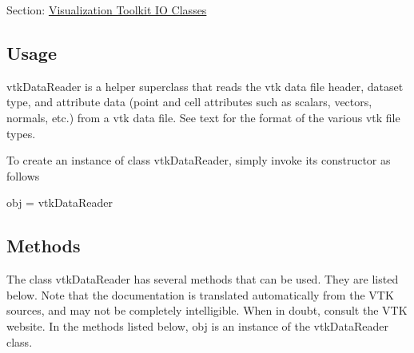 Section\-: \hyperlink{sec_vtkio}{Visualization Toolkit I\-O Classes} \hypertarget{vtkwidgets_vtkxyplotwidget_Usage}{}\subsection{Usage}\label{vtkwidgets_vtkxyplotwidget_Usage}
vtk\-Data\-Reader is a helper superclass that reads the vtk data file header, dataset type, and attribute data (point and cell attributes such as scalars, vectors, normals, etc.) from a vtk data file. See text for the format of the various vtk file types.

To create an instance of class vtk\-Data\-Reader, simply invoke its constructor as follows \begin{DoxyVerb}  obj = vtkDataReader
\end{DoxyVerb}
 \hypertarget{vtkwidgets_vtkxyplotwidget_Methods}{}\subsection{Methods}\label{vtkwidgets_vtkxyplotwidget_Methods}
The class vtk\-Data\-Reader has several methods that can be used. They are listed below. Note that the documentation is translated automatically from the V\-T\-K sources, and may not be completely intelligible. When in doubt, consult the V\-T\-K website. In the methods listed below, {\ttfamily obj} is an instance of the vtk\-Data\-Reader class. 
